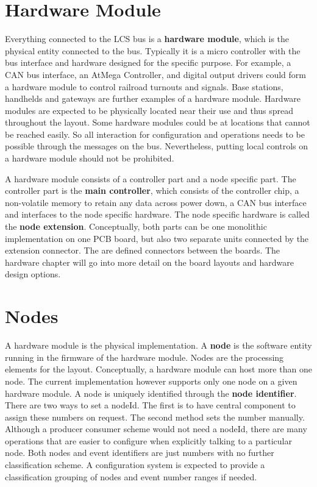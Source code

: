 \section{Hardware Module}

Everything connected to the LCS bus is a {\bf hardware module}, which is the physical entity connected to the bus. Typically it is a micro controller with the bus interface and hardware designed for the specific purpose. For example, a CAN bus interface, an AtMega Controller, and digital output drivers could form a hardware module to control railroad turnouts and signals. Base stations, handhelds and gateways are further examples of a hardware module. Hardware modules are expected to be physically located near their use and thus spread throughout the layout. Some hardware modules could be at locations that cannot be reached easily. So all interaction for configuration and operations needs to be possible through the messages on the bus. Nevertheless, putting local controls on a hardware module should not be prohibited.

A hardware module consists of a controller part and a node specific part. The controller part is the {\bf main controller}, which consists of the controller chip, a non-volatile memory to retain any data across power down, a CAN bus interface and interfaces to the node specific hardware. The node specific hardware is called the {\bf node extension}. Conceptually, both parts can be one monolithic implementation on one PCB board, but also two separate units connected by the extension connector. The are defined connectors between the boards. The hardware chapter will go into more detail on the board layouts and hardware design options.

\section{Nodes}

A hardware module is the physical implementation. A {\bf node} is the software entity running in the firmware of the hardware module. Nodes are the processing elements for the layout. Conceptually, a hardware module can host more than one node. The current implementation however supports only one node on a given hardware module. A node is uniquely identified through the {\bf node identifier}. There are two ways to set a nodeId. The first is to have central component to assign these numbers on request. The second method sets the number manually. Although a producer consumer scheme would not need a nodeId, there are many operations that are easier to configure when explicitly talking to a particular node. Both nodes and event identifiers are just numbers with no further classification scheme. A configuration system is expected to provide a classification grouping of nodes and event number ranges if needed.


